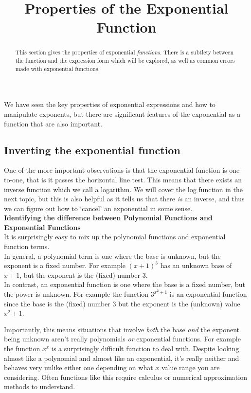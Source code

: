 \documentclass{ximeraXloud}
\title{Properties of the Exponential Function}
\begin{document}
\begin{abstract}
    This section gives the properties of exponential \textit{functions}. There is a subtlety between the function and the expression form which will be explored, as well as common errors made with exponential functions.
\end{abstract}
\maketitle
    
We have seen the key properties of exponential expressions and how to manipulate exponents, but there are significant features of the exponential as a function that are also important. 

\subsection*{Inverting the exponential function}

    One of the more important observations is that the exponential function is one-to-one, that is it passes the horizontal line test. This means that there exists an inverse function which we call a logarithm. We will cover the log function in the next topic, but this is also helpful as it tells us that there \textit{is} an inverse, and thus we can figure out how to `cancel' an exponential in some sense.\\
    
    {\bfseries Identifying the difference between Polynomial Functions and Exponential Functions}\\%
    
        It is surprisingly easy to mix up the polynomial functions and exponential function terms.\\
        In general, a polynomial term is one where the base is unknown, but the exponent is a fixed number. For example $(x+1)^3$ has an unknown base of $x + 1$, but the exponent is the (fixed) number $3$.\\
        In contrast, an exponential function is one where the base is a fixed number, but the power is unknown. For example the function $3^{x^2+1}$ is an exponential function since the base is the (fixed) number $3$ but the exponent is the (unknown) value $x^2 + 1$.
        
        Importantly, this means situations that involve \textit{both} the base \textit{and} the exponent being unknown aren't really polynomials \textit{or} exponential functions. For example the function $x^x$ is a surprisingly difficult function to deal with. Despite looking almost like a polynomial and almost like an exponential, it's really neither and behaves very unlike either one depending on what $x$ value range you are considering. Often functions like this require calculus or numerical approximation methods to understand.
        
\end{document}
